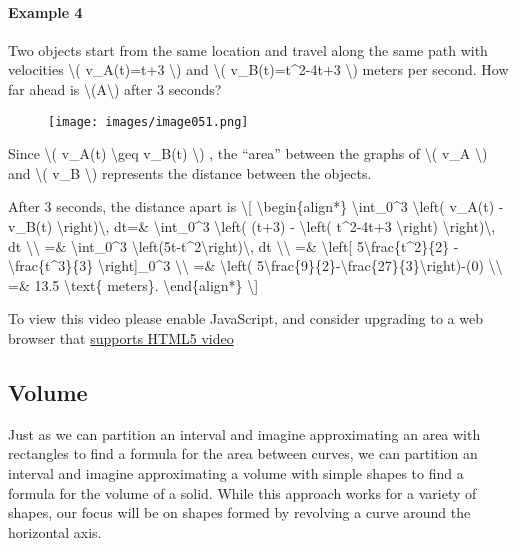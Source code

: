 \hypertarget{example-4}{%
\paragraph{Example 4}\label{example-4}}

Two objects start from the same location and travel along the same path
with velocities \textbackslash{}( v\_A(t)=t+3 \textbackslash{}) and
\textbackslash{}( v\_B(t)=t\^{}2-4t+3 \textbackslash{}) meters per
second. How far ahead is \textbackslash{}(A\textbackslash{}) after 3
seconds?

\begin{figure}
\centering
\texttt{[image: images/image051.png]}
\caption{}
\end{figure}

Since \textbackslash{}( v\_A(t) \textbackslash{}geq v\_B(t)
\textbackslash{}) , the ``area'' between the graphs of \textbackslash{}(
v\_A \textbackslash{}) and \textbackslash{}( v\_B \textbackslash{})
represents the distance between the objects.

After 3 seconds, the distance apart is \textbackslash{}{[}
\textbackslash{}begin\{align*\} \textbackslash{}int\_0\^{}3
\textbackslash{}left( v\_A(t) - v\_B(t)
\textbackslash{}right)\textbackslash{}, dt=\&
\textbackslash{}int\_0\^{}3 \textbackslash{}left( (t+3) -
\textbackslash{}left( t\^{}2-4t+3 \textbackslash{}right)
\textbackslash{}right)\textbackslash{}, dt
\textbackslash{}\textbackslash{} =\& \textbackslash{}int\_0\^{}3
\textbackslash{}left(5t-t\^{}2\textbackslash{}right)\textbackslash{}, dt
\textbackslash{}\textbackslash{} =\& \textbackslash{}left{[}
5\textbackslash{}frac\{t\^{}2\}\{2\}
-\textbackslash{}frac\{t\^{}3\}\{3\} \textbackslash{}right{]}\_0\^{}3
\textbackslash{}\textbackslash{} =\& \textbackslash{}left(
5\textbackslash{}frac\{9\}\{2\}-\textbackslash{}frac\{27\}\{3\}\textbackslash{}right)-(0)
\textbackslash{}\textbackslash{} =\& 13.5 \textbackslash{}text\{
meters\}. \textbackslash{}end\{align*\} \textbackslash{}{]}

To view this video please enable JavaScript, and consider upgrading to a
web browser that \href{http://videojs.com/html5-video-support/}{supports
HTML5 video}

\hypertarget{volume}{%
\subsection{Volume}\label{volume}}

Just as we can partition an interval and imagine approximating an area
with rectangles to find a formula for the area between curves, we can
partition an interval and imagine approximating a volume with simple
shapes to find a formula for the volume of a solid. While this approach
works for a variety of shapes, our focus will be on shapes formed by
revolving a curve around the horizontal axis.

